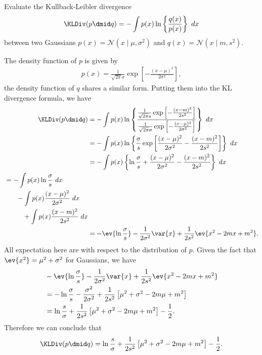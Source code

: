 \begin{question}{1.30}
	Evaluate the Kullback-Leibler divergence
	\begin{align*}
		\KLDiv(p \dmid q) = -\int p(x) \ln \left\{ \frac{q(x)}{p(x)} \right\}\ dx
	\end{align*}
	between two Gaussians $p(x) = \mathcal{N}(x \mid \mu, \sigma^2)$ and $q(x) = \mathcal{N}(x \mid m, s^2)$.
\end{question}

\begin{answer}{}
	The density function of $p$ is given by
	\begin{align}
		p(x) = \frac{1}{\sqrt{2\pi}\sigma} \exp\left[ -\frac{(x - \mu)^2}{2\sigma^2} \right],
	\end{align}
	the density function of $q$ shares a similar form. Putting them into the KL divergence formula, we have
	\begin{align}
		\KLDiv(p \dmid q) &= -\int p(x) \ln \left\{ \frac{\frac{1}{\sqrt{2\pi}s} \exp\left[ -\frac{(x - m)^2}{2s^2} \right]}{\frac{1}{\sqrt{2\pi}\sigma} \exp\left[ -\frac{(x - \mu)^2}{2\sigma^2} \right]} \right\}\ dx\\
		&= -\int p(x) \ln \left\{ \frac{\sigma}{s}\exp \left[ \frac{(x - \mu)^2}{2\sigma^2} - \frac{(x - m)^2}{2s^2}\right]  \right\}\ dx\\
		&= -\int p(x) \left\{ \ln \frac{\sigma}{s} + \frac{(x - \mu)^2}{2\sigma^2} - \frac{(x - m)^2}{2s^2}  \right\}\ dx\\
		\begin{split}
		&= -\int p(x)  \ln \frac{\sigma}{s}\ dx\\
		&\phantom{=}\quad - \int p(x) \frac{(x - \mu)^2}{2\sigma^2}\ dx\\
		&\phantom{=}\quad\quad + \int p(x)\frac{(x - m)^2}{2s^2}\ dx
		\end{split}\\
		&= -\ev{\ln \frac{\sigma}{s} } -\frac{1}{2\sigma^2}\var{x} + \frac{1}{2s^2} \ev{x^2 - 2mx + m^2}.
	\end{align}
	All expectation here are with respect to the distribution of $p$. Given the fact that $\ev{x^2} = \mu^2 + \sigma^2$ for Gaussians, we have
	\begin{align}
		&-\ev{\ln \frac{\sigma}{s} } -\frac{1}{2\sigma^2}\var{x} + \frac{1}{2s^2} \ev{x^2 - 2mx + m^2}\\
		&= -\ln \frac{\sigma}{s} - \frac{\sigma^2}{2\sigma^2} + \frac{1}{2s^2}\left[ \mu^2 + \sigma^2 - 2m\mu + m^2 \right]\\
		&= \ln \frac{s}{\sigma} + \frac{1}{2s^2}\left[ \mu^2 + \sigma^2 - 2m\mu + m^2 \right] - \frac{1}{2}.
	\end{align}
	Therefore we can conclude that
	\begin{align}
		\KLDiv(p \dmid q) = \ln \frac{s}{\sigma}  + \frac{1}{2s^2}\left[ \mu^2 + \sigma^2 - 2m\mu + m^2 \right] - \frac{1}{2}.
	\end{align}
\end{answer}